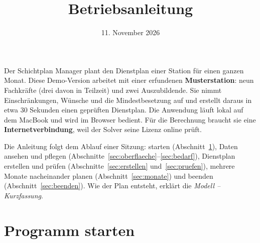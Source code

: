 \documentclass[11pt]{combiArticle}
\begin{document}
\title{Betriebsanleitung}
\date{11. November 2026}
\maketitle

Der Schichtplan Manager plant den Dienstplan einer Station für einen ganzen Monat. Diese Demo-Version arbeitet
mit einer erfundenen \textbf{Musterstation}: neun Fachkräfte (drei davon in Teilzeit) und zwei Auszubildende.
Sie nimmt Einschränkungen, Wünsche und die Mindestbesetzung auf und erstellt daraus in etwa 30 Sekunden einen
geprüften Dienstplan. Die Anwendung läuft lokal auf dem MacBook und wird im Browser bedient.
Für die Berechnung braucht sie eine \textbf{Internetverbindung}, weil der Solver seine Lizenz online prüft.

Die Anleitung folgt dem Ablauf einer Sitzung: starten (Abschnitt~\ref{sec:start}), Daten ansehen und pflegen
(Abschnitte~\ref{sec:oberflaeche}--\ref{sec:bedarf}), Dienstplan erstellen und prüfen
(Abschnitte~\ref{sec:erstellen} und~\ref{sec:pruefen}), mehrere Monate nacheinander planen
(Abschnitt~\ref{sec:monate}) und beenden (Abschnitt~\ref{sec:beenden}). Wie der Plan entsteht, erklärt die
\emph{Modell -- Kurzfassung}.

\section{Programm starten}\label{sec:start}
\end{document}
